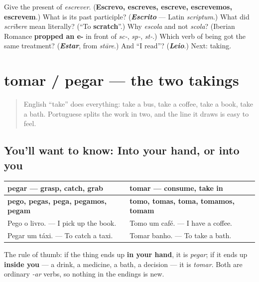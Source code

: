 \begin{tcolorbox}[breakable,colback=teal!4,colframe=teal!35!black,title={Before you move on}]
Give the present of \emph{escrever}. (\textbf{Escrevo, escreves, escreve, escrevemos, escrevem}.) What is its past participle? (\emph{\textbf{Escrito}} — Latin \emph{scriptum}.) What did \emph{scrībere} mean literally? (\textquotedblleft{}To \textbf{scratch}\textquotedblright{}.) Why \emph{escola} and not \emph{scola}? (Iberian Romance \textbf{propped an e-} in front of \emph{sc-}, \emph{sp-}, \emph{st-}.) Which verb of being got the same treatment? (\emph{\textbf{Estar}}, from \emph{stāre}.) And \textquotedblleft{}I read\textquotedblright{}? (\emph{\textbf{Leio}}.) Next: taking.
\end{tcolorbox}
\section[tomar / pegar]{tomar / pegar — the two takings}

\label{lesson:PT-C19-tomar-pegar}



\begin{quote}
English \textquotedblleft{}take\textquotedblright{} does everything: take a bus, take a coffee, take a book, take a bath. Portuguese splits the work in two, and the line it draws is easy to feel.
\end{quote}

\subsection*{You'll want to know: Into your hand, or into you}
\noindent
\begin{tabularx}{\linewidth}{@{}>{\raggedright\arraybackslash}X>{\raggedright\arraybackslash}X@{}}
\toprule
\textbf{pegar — grasp, catch, grab} & \textbf{tomar — consume, take in} \\
\midrule
\textbf{pego, pegas, pega, pegamos, pegam} & \textbf{tomo, tomas, toma, tomamos, tomam} \\
Pego o livro. — I pick up the book. & Tomo um café. — I have a coffee. \\
Pegar um táxi. — To catch a taxi. & Tomar banho. — To take a bath. \\
\bottomrule
\end{tabularx}

The rule of thumb: if the thing ends up \textbf{in your hand}, it is \emph{pegar}; if it ends up \textbf{inside you} — a drink, a medicine, a bath, a decision — it is \emph{tomar}. Both are ordinary \emph{-ar} verbs, so nothing in the endings is new.

